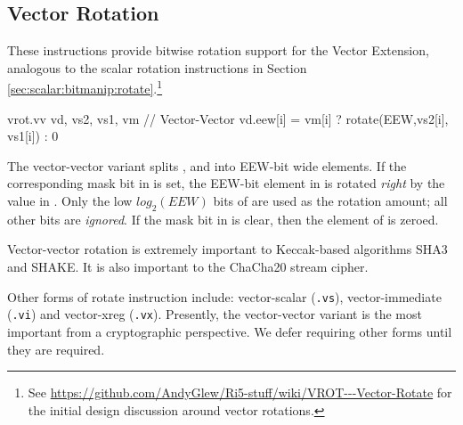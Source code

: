 
\subsection{Vector Rotation}

These instructions provide bitwise rotation support for the
Vector Extension, analogous to the scalar rotation instructions
in Section \ref{sec:scalar:bitmanip:rotate}.\footnote{
See \url{https://github.com/AndyGlew/Ri5-stuff/wiki/VROT---Vector-Rotate}
for the initial design discussion around vector rotations.
}

\begin{cryptoisa}
vrot.vv     vd, vs2, vs1, vm        // Vector-Vector
    vd.eew[i] = vm[i] ? rotate(EEW,vs2[i], vs1[i]) : 0
\end{cryptoisa}

The vector-vector variant splits \vrd,  and  into
EEW-bit wide elements.
If the corresponding mask bit in \vm is set,
the EEW-bit element in  is rotated
{\em right} by the value in .
Only the low $log_2(EEW)$ bits of  are used as the rotation
amount; all other bits are {\em ignored}.
If the mask bit in \vm is clear, then the element of \vrd is zeroed.


Vector-vector rotation is extremely important to Keccak-based algorithms 
SHA3 and SHAKE.
It is also important to the ChaCha20 stream cipher.

Other forms of rotate instruction include:
vector-scalar (\texttt{.vs}),
vector-immediate (\texttt{.vi})
and
vector-xreg (\texttt{.vx}).
Presently, the vector-vector variant is the most important from a
cryptographic perspective.
We defer requiring other forms until they are required.
